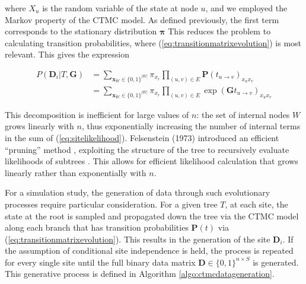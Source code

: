 where $X_u$ is the random variable of the state at node $u$, and we employed the Markov property of the CTMC model. As defined previously, the first term corresponds to the stationary distribution $\boldsymbol{\pi}$ This reduces the problem to calculating transition probabilities, where (\ref{eq:transitionmatrixevolution}) is most relevant. This gives the expression

\begin{align}
    P(\mathbf{D}_i | T, \mathbf{G}) &= \sum_{\mathbf{x}_W \in \{0, 1\}^{|W|}} \pi_{x_r} \prod_{(u, v) \in E} \mathbf{P}(t_{u\to v})_{x_u x_v} \\
    &= \sum_{\mathbf{x}_W \in \{0, 1\}^{|W|}} \pi_{x_r} \prod_{(u, v) \in E} \exp(\mathbf{G}t_{u\to v})_{x_u x_v} \label{eq:sitelikelihood}
\end{align}

This decomposition is inefficient for large values of $n$: the set of internal nodes $W$ grows linearly with $n$, thus exponentially increasing the number of internal terms in the sum of (\ref{eq:sitelikelihood}). Felsenstein (1973) introduced an efficient ``pruning'' method {\cite{Felsenstein1973}}, exploiting the structure of the tree to recursively evaluate likelihoods of subtrees \cite{Felsenstein2004}. This allows for efficient likelihood calculation that grows linearly rather than exponentially with $n$.

For a simulation study, the generation of data through such evolutionary processes require particular consideration. For a given tree $T$, at each site, the state at the root is sampled and propagated down the tree via the CTMC model along each branch that has transition probabilities $\mathbf{P}(t)$ via (\ref{eq:transitionmatrixevolution}). This results in the generation of the site $\mathbf{D}_i$. If the assumption of conditional site independence is held, the process is repeated for every single site until the full binary data matrix $\mathbf{D} \in \{0, 1\}^{n \times S}$ is generated. This generative process is defined in Algorithm \ref{algo:ctmcdatageneration}. 

